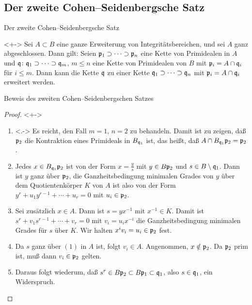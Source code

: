 \subsection{Der zweite Cohen--Seidenbergsche Satz}

\begin{frame}{Der zweite Cohen--Seidenbergsche Satz}
	\begin{theorem}<+->
		\label{thm:going_down}
		Sei \(A \subset B\) eine ganze Erweiterung von Integritätsbereichen,
		und sei \(A\) ganz abgeschlossen. Dann gilt: 
		Seien \(\mathfrak{p}_1 \supset \dotsb
		\supset \mathfrak{p}_n\) eine Kette von Primidealen in \(A\) und
		\(\mathfrak{q} \colon \mathfrak{q}_1 \supset \dotsb \supset \mathfrak{q}_m\),
		\(m \le n\)
		eine Kette von Primidealen von \(B\) mit \(\mathfrak{p}_i = A \cap \mathfrak{q}_i\) für \(i \le m\).
		Dann kann die Kette \(\mathfrak{q}\) zu einer Kette \(\mathfrak{q}_1 \supset
		\dotsb \supset \mathfrak{q}_n\) mit \(\mathfrak{p}_i = A \cap \mathfrak{q}_i\)
		erweitert werden.
	\end{theorem}
\end{frame}

\begin{frame}{Beweis des zweiten Cohen--Seidenbergschen Satzes}
	\begin{proof}<+->
		\begin{enumerate}[<+->]
		\item<.->
			Es reicht, den Fall \(m = 1\), \(n = 2\) zu behandeln. Damit ist zu
			zeigen, daß \(\mathfrak{p}_2\) die Kontraktion eines Primideals in
			\(B_{\mathfrak{q}_1}\) ist, das heißt, daß
			\(A \cap B_{\mathfrak{q}_1} \mathfrak{p}_2 = \mathfrak{p}_2\).
		\item
			Jedes \(x \in B_{\mathfrak{q}_1} \mathfrak{p}_2\) ist von der Form
			\(x = \frac y s\) mit \(y \in B \mathfrak{p}_2\) und \(s \in
			B \setminus \mathfrak{q}_1\). Dann ist \(y\) ganz über \(\mathfrak{p}_2\),
			die Ganzheitsbedingung minimalen Grades von \(y\) über dem
			Quotientenkörper \(K\) von \(A\)
			ist also von der Form \(y^r + u_1 y^{r - 1} + \dotsb + u_r = 0\)
			mit \(u_i \in \mathfrak{p}_2\).
		\item
			Sei zusätzlich \(x \in A\). Dann ist \(s = y x^{-1}\) mit \(x^{-1}
			\in K\). Damit ist \(s^r + v_1 s^{r - 1} + \dotsb + v_r = 0\) mit
			\(v_i = u_i x^{-i}\) die Ganzheitsbedingung minimalen Grades für
			\(s\) über \(K\). Wir halten \(x^i v_i = u_i \in \mathfrak{p}_2\) fest.
		\item
			Da \(s\) ganz über \((1)\) in \(A\) ist, folgt \(v_i \in A\).
			Angenommen, \(x \notin \mathfrak{p}_2\). Da \(\mathfrak{p}_2\) prim ist,
			muß dann \(v_i \in \mathfrak{p}_2\) gelten.
		\item
			Daraus folgt wiederum, daß \(s^r \in B \mathfrak{p}_2 \subset
			B \mathfrak{p}_1 \subset \mathfrak{q}_1\), also \(s \in \mathfrak{q}_1\),
			ein Widerspruch.
			\qedhere
		\end{enumerate}
	\end{proof}
\end{frame}

